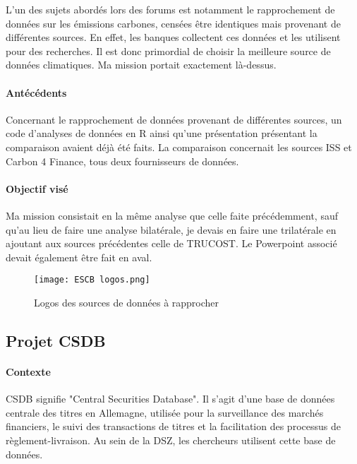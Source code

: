 L'un des sujets abordés lors des forums est notamment le rapprochement de données sur les émissions carbones, censées être identiques mais provenant de différentes sources.
En effet, les banques collectent ces données et les utilisent pour des recherches. Il est donc primordial de choisir la meilleure source de données climatiques.
Ma mission portait exactement là-dessus.

\paragraph{Antécédents}

Concernant le rapprochement de données provenant de différentes sources, un code d'analyses de données en R ainsi qu'une présentation présentant la comparaison avaient déjà été faits.
La comparaison concernait les sources ISS et Carbon 4 Finance, tous deux fournisseurs de données. 

\paragraph{Objectif visé}

Ma mission consistait en la même analyse que celle faite précédemment, sauf qu'au lieu de faire une analyse bilatérale, je devais en faire une trilatérale en ajoutant aux sources précédentes celle de TRUCOST.
Le Powerpoint associé devait également être fait en aval.

\begin{figure}[H]
    \centering
    \texttt{[image: ESCB logos.png]}
    \caption{Logos des sources de données à rapprocher}
\end{figure}

\pagebreak

\subsection{Projet CSDB}

\paragraph{Contexte}

CSDB signifie "Central Securities Database". Il s'agit d'une base de données centrale des titres en Allemagne, utilisée pour la surveillance des marchés financiers, le suivi des transactions de titres et la facilitation des processus de règlement-livraison.
Au sein de la DSZ, les chercheurs utilisent cette base de données.
\\

